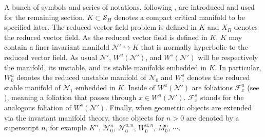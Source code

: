 \documentclass[11pt]{article}
\theoremstyle{remark}
\begin{document}
A bunch of symbols and series of notations, following \cite{Sz1991}, are introduced and used for the remaining section.
$K\subset\mathcal{S}_H$ denotes a compact critical manifold to be specified later. The reduced vector field problem is defined in $K$ and $X_R$ denotes the reduced vector field. As the reduced vector field is defined in $K$, $K$ may contain a finer invariant manifold $\mathcal{N}' \hookrightarrow K$ that is normally hyperbolic to the reduced vector field.
As usual $\mathcal{N'}$, $W^u(\mathcal{N}')$, and $W^s(\mathcal{N}')$ will be respectively the manifold, its unstable, and its stable manifolds embedded in $K$. In particular, $W_0^u$ denotes the reduced unstable manifold of $\mathcal{N}_0$ and $W_1^s$ denotes the reduced stable manifold of $\mathcal{N}_1$ embedded in $K$. Inside of $W^u(\mathcal{N}')$ are foliations $\mathcal{F}^u_x$ (see \cite[Theorem 12.2]{fenichel_geometric_1979}), meaning a foliation that passes  through $x\in W^u(\mathcal{N}')$.
$\mathcal{F}^s_x$ stands for the analogous foliation of  $W^s(\mathcal{N}')$.
Finally, when geometric objects are extended via the invariant manifold theory,  those objects for $n>0$  are denoted by a superscript $n$, for example $K^n$, $\mathcal{N}_0^n$, $\mathcal{N}_0^{u,n}$, $W_0^{u,n}$, $M_0^n$, $\cdots$.
\end{document}
